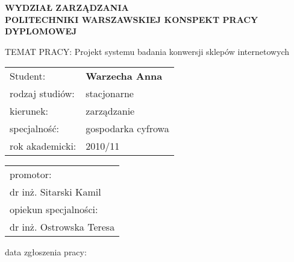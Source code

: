 
\begin{center}
\fontsize{15.2pt}{26pt}\sffamily\bfseries
WYDZIAŁ ZARZĄDZANIA \\
\fontsize{10.8pt}{17pt}\sffamily\bfseries
POLITECHNIKI WARSZAWSKIEJ
\vskip 1.4in
\fontsize{15pt}{2}\sffamily\bfseries
KONSPEKT PRACY DYPLOMOWEJ
\end{center} 

\vskip0.4in

\begin{flushleft}
\fontsize{12pt}{16}\sffamily 
TEMAT PRACY: {Projekt systemu badania konwersji sklepów internetowych}
\vskip 1.1in
\hspace{-8pt}\begin{tabular}{ll}
  Student:&\hspace{17pt} \bfseries Warzecha Anna \\[40pt]
  rodzaj studiów:&\hspace{17pt} stacjonarne \\
  kierunek:&\hspace{17pt} zarządzanie \\
  specjalność:&\hspace{17pt} gospodarka cyfrowa \\
  rok akademicki:&\hspace{17pt} 2010/11 \\
\end{tabular} 
\end{flushleft}
\vskip 0.1in
\begin{center}
\fontsize{12pt}{27}\sffamily
\hspace{165pt}\begin{tabular}{l}
  promotor: \\ 
  {dr inż. Sitarski Kamil}\\
  opiekun specjalności:\\
  {dr inż. Ostrowska Teresa}\\
\end{tabular}
\end{center}
\begin{flushleft}
\fontsize{12pt}{14}\sffamily
data zgłoszenia pracy:\\
\end{flushleft}
\newpage

\tableofcontents
\newpage

